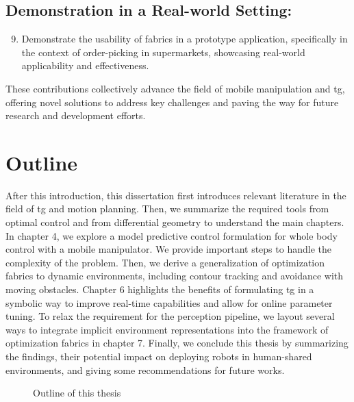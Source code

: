 \subsection{Demonstration in a Real-world Setting:}
\begin{enumerate}
    \setcounter{enumi}{8}
    \item Demonstrate the usability of \ac{fabrics}
      in a prototype application, specifically in the
      context of order-picking in supermarkets, showcasing
      real-world applicability and effectiveness.
\end{enumerate}

These contributions collectively advance the field of mobile
manipulation and \ac{tg}, offering novel
solutions to address key challenges and paving the way for
future research and development efforts.





\section{Outline}

After this introduction, this dissertation first introduces
relevant literature in the field of \ac{tg}
and motion planning. Then, we summarize the required tools
from optimal control and from differential geometry to
understand the main chapters. In chapter 4, we explore a
model predictive control formulation for whole body control
with a mobile manipulator. We provide important steps to
handle the complexity of the problem. Then, we derive a
generalization of optimization fabrics to dynamic
environments, including contour tracking and avoidance with
moving obstacles. Chapter 6 highlights the benefits of
formulating \ac{tg} in a symbolic way to
improve real-time capabilities and allow for online
parameter tuning. To relax the requirement for the
perception pipeline, we layout several ways to integrate
implicit environment representations into the framework of
optimization fabrics in chapter 7. Finally, we conclude this
thesis by summarizing the findings, their potential impact
on deploying robots in human-shared environments, and giving some
recommendations for future works.

\begin{figure}
  \begin{center}
    
  \end{center}
  \caption{Outline of this thesis}
  \label{fig:outline}
\end{figure}

